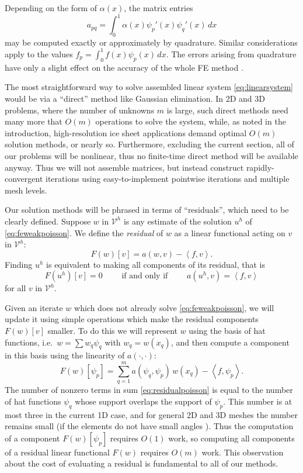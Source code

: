 \documentclass[letterpaper,final,12pt,reqno]{amsart}
\theoremstyle{claim}
\newcommand{\ip}[2]{\left<#1,#2\right>}
\numberwithin{equation}{section}
\numberwithin{figure}{section}
\numberwithin{table}{section}
\numberwithin{theorem}{section}
\begin{document}
Depending on the form of $\alpha(x)$, the matrix entries
\begin{equation}
  a_{pq} = \int_0^1 \alpha(x) \psi_p'(x) \psi_q'(x)\,dx \label{eq:poissonentries}
\end{equation}
may be computed exactly or approximately by quadrature.  Similar considerations apply to the values $f_p = \int_0^1 f(x) \psi_p(x)\,dx$.  The errors arising from quadrature have only a slight effect on the accuracy of the whole FE method \cite{Braess2007}.

The most straightforward way to solve assembled linear system \eqref{eq:linearsystem} would be via a ``direct'' method like Gaussian elimination.  In 2D and 3D problems, where the number of unknowns $m$ is large, such direct methods need many more that $O(m)$ operations to solve the system, while, as noted in the introduction, high-resolution ice sheet applications demand optimal $O(m)$ solution methods, or nearly so.  Furthermore, excluding the current section, all of our problems will be nonlinear, thus no finite-time direct method will be available anyway.  Thus we will not assemble matrices, but instead construct rapidly-convergent iterations using easy-to-implement pointwise iterations and multiple mesh levels.

Our solution methods will be phrased in terms of ``residuals'', which need to be clearly defined.  Suppose $w$ in $\mathcal{V}^h$ is any estimate of the solution $u^h$ of \eqref{eq:feweakpoisson}.  We define the \emph{residual} of $w$ as a linear functional acting on $v$ in $\mathcal{V}^h$:
\begin{equation}
  F(w)[v] = a(w,v) - \ip{f}{v}.  \label{eq:residual}
\end{equation}
Finding $u^h$ is equivalent to making all components of its residual, that is
\begin{equation}
  F(u^h)[v]=0 \qquad \text{ if and only if } \qquad a(u^h,v)=\ip{f}{v} \label{eq:residualweakequivalence}
\end{equation}
for all $v$ in $\mathcal{V}^h$.

Given an iterate $w$ which does not already solve \eqref{eq:feweakpoisson}, we will update it using simple operations which make the residual components $F(w)[v]$ smaller.  To do this we will represent $w$ using the basis of hat functions, i.e.~$w = \sum w_q \psi_q$ with $w_q = w(x_q)$, and then compute a component in this basis using the linearity of $a(\cdot,\cdot)$:
\begin{equation}
  F(w)[\psi_p] = \sum_{q=1}^{m} a(\psi_q,\psi_p) \,w(x_q) - \ip{f}{\psi_p}.  \label{eq:residualpoisson}
\end{equation}
The number of nonzero terms in sum \eqref{eq:residualpoisson} is equal to the number of hat functions $\psi_q$ whose support overlaps the support of $\psi_p$.  This number is at most three in the current 1D case, and for general 2D and 3D meshes the number remains small (if the elements do not have small angles \cite{Braess2007}).  Thus the computation of a component $F(w)[\psi_p]$ requires $O(1)$ work, so computing all components of a residual linear functional $F(w)$ requires $O(m)$ work.  This observation about the cost of evaluating a residual is fundamental to all of our methods.
\end{document}
